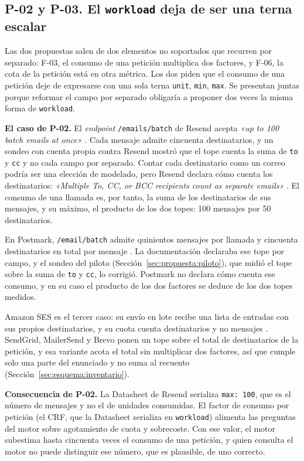 \subsection{P-02 y P-03. El \texttt{workload} deja de ser una terna escalar}
\label{subsec:evolucion:p02}

Las dos propuestas salen de dos elementos no soportados que recurren por separado: F-03, el consumo de una petición multiplica dos factores, y F-06, la cota de la petición está en otra métrica.
Los dos piden que el consumo de una petición deje de expresarse con una sola terna \texttt{unit}, \texttt{min}, \texttt{max}.
Se presentan juntas porque reformar el campo por separado obligaría a proponer dos veces la misma forma de \texttt{workload}.

\textbf{El caso de P-02.} El \textit{endpoint} \texttt{/emails/batch} de Resend acepta \textit{«up to 100 batch emails at once»} \citep{resenddocs}.
Cada mensaje admite cincuenta destinatarios, y un sondeo con cuenta propia contra Resend mostró que el tope cuenta la suma de \texttt{to} y \texttt{cc} y no cada campo por separado.
Contar cada destinatario como un correo podría ser una elección de modelado, pero Resend declara cómo cuenta los destinatarios: \textit{«Multiple To, CC, or BCC recipients count as separate emails»} \citep{resenddocs}.
El consumo de una llamada es, por tanto, la suma de los destinatarios de sus mensajes, y su máximo, el producto de los dos topes: 100 mensajes por 50 destinatarios.

En Postmark, \texttt{/email/batch} admite quinientos mensajes por llamada y cincuenta destinatarios en total por mensaje \citep{postmarkapi}.
La documentación declaraba ese tope por campo, y el sondeo del piloto (Sección~\ref{sec:propuesta:piloto}), que midió el tope sobre la suma de \texttt{to} y \texttt{cc}, lo corrigió.
Postmark no declara cómo cuenta ese consumo, y en su caso el producto de los dos factores se deduce de los dos topes medidos.

Amazon SES es el tercer caso: su envío en lote recibe una lista de entradas con sus propios destinatarios, y su cuota cuenta destinatarios y no mensajes \citep{sesdocs}.
SendGrid, MailerSend y Brevo ponen un tope sobre el total de destinatarios de la petición, y esa variante acota el total sin multiplicar dos factores, así que cumple solo una parte del enunciado y no suma al recuento (Sección~\ref{sec:esquema:inventario}).

\textbf{Consecuencia de P-02.} La Datasheet de Resend serializa \texttt{max: 100}, que es el número de mensajes y no el de unidades consumidas.
El factor de consumo por petición (el CRF, que la Datasheet serializa en \texttt{workload}) alimenta las preguntas del motor sobre agotamiento de cuota y sobrecoste.
Con ese valor, el motor subestima hasta cincuenta veces el consumo de una petición, y quien consulta el motor no puede distinguir ese número, que es plausible, de uno correcto.

